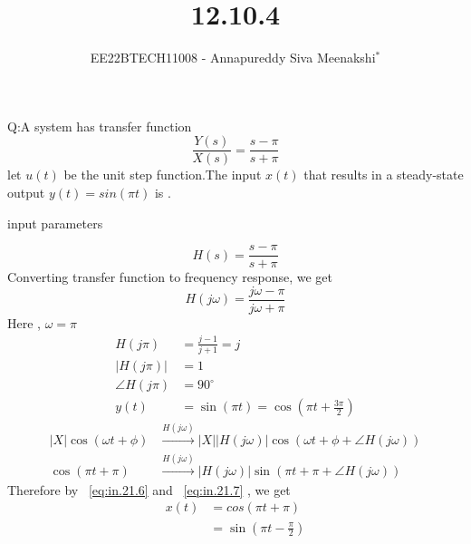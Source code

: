 \documentclass[journal,12pt,twocolumn]{IEEEtran}
\newcommand{\system}[1]{\stackrel{#1}{\rightarrow}}
\theoremstyle{remark}
\begin{document}

\vspace{3cm}

\title{12.10.4}
\author{EE22BTECH11008 - Annapureddy Siva Meenakshi$^{*}$%
}
\maketitle
\bigskip

\renewcommand{\thefigure}{\theenumi}
\renewcommand{\thetable}{\theenumi}
Q:A system has transfer function
 \[\frac{Y(s)}{X(s)}=\frac {s-\pi}{s+\pi}\]
 let $u(t)$ be the unit step function.The input $x(t)$ that results in a steady-state output $y(t)=sin(\pi t)$ is \underline{\quad}.
\solution
\begin{table}[!ht]
    \centering
        
    \caption{input parameters}
    \label{tab:in_21_t1}
\end{table}
 \begin{equation}
     H(s)=\frac{s-\pi}{s+\pi}
 \end{equation} 
 Converting transfer function to frequency response, we get
 \begin{equation}
     H(j\omega)=\frac{j\omega-\pi}{j\omega+\pi}
 \end{equation}
 Here , $\omega=\pi$
 \begin{align}
    H(j\pi)&=\frac{j-1}{j+1}=j\\
     |H(j\pi)|&=1\\
    \angle H(j\pi)&=90^\circ\\
    y(t)&=\sin(\pi t)=\cos(\pi t+\frac{3\pi}{2})\label{eq:in.21.6} 
\end{align}
\begin{align}
  |X|\cos(\omega t+\phi)&\system{H(j\omega)}|X||H(j\omega)|\cos(\omega t +\phi +\angle H(j\omega))\label{eq:in.21.7}\\
  \cos(\pi t+\pi)&\system{H(j\omega)}|H(j\omega)|\sin(\pi t +\pi +\angle H(j\omega))
\end{align}
Therefore by ~\eqref{eq:in.21.6} and ~\eqref{eq:in.21.7} , we get
\begin{align}
    x(t)&=cos(\pi t+\pi)\\
    &=\sin\left(\pi t -\frac{\pi}{2}\right)
\end{align}
 
\end{document}
